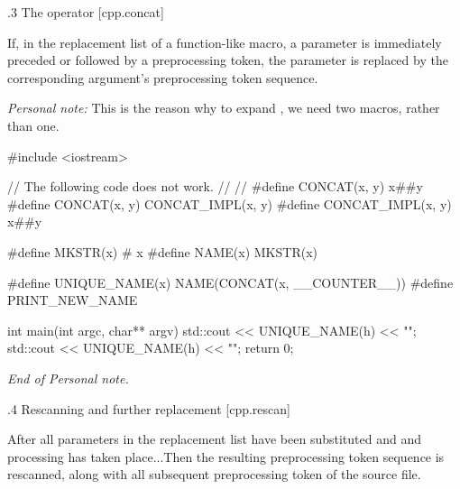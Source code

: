 .3 The \symbol{\#\#} operator [cpp.concat]

If, in the replacement list of a function-like macro, a parameter is immediately
preceded or followed by a \symbol{\#\#} preprocessing token, the parameter is
replaced by the corresponding argument's preprocessing token sequence.

{\sl Personal note:} This is the reason why to expand ,
we need two macros, rather than one.

\begtt
#include <iostream>

// The following code does not work.
//
//    #define CONCAT(x, y) x##y
#define CONCAT(x, y) CONCAT_IMPL(x, y)
#define CONCAT_IMPL(x, y) x##y

#define MKSTR(x) # x
#define NAME(x) MKSTR(x)

#define UNIQUE_NAME(x) NAME(CONCAT(x, __COUNTER__))
#define PRINT_NEW_NAME

int main(int argc, char** argv) {
  std::cout << UNIQUE_NAME(h) << "\n";
  std::cout << UNIQUE_NAME(h) << "\n";
  return 0;
}
\endtt

{\sl End of Personal note.}

.4 Rescanning and further replacement [cpp.rescan]

After all parameters in the replacement list have been substituted and
\symbol{\#} and \symbol{\#\#} processing has taken place...Then the resulting
preprocessing token sequence is rescanned, along with all subsequent
preprocessing token of the source file.

\vfill
\bye
